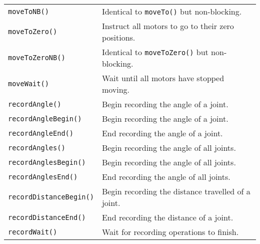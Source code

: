 \begin{table}[!h]
\begin{center}
\begin{tabular}{p{48 mm}p{110 mm}}
\texttt{moveToNB()} & Identical to \texttt{moveTo()} but non-blocking. \\
\texttt{moveToZero()} & Instruct all motors to go to their zero positions. \\
\texttt{moveToZeroNB()} & Identical to \texttt{moveToZero()} but non-blocking. \\
\texttt{moveWait()} & Wait until all motors have stopped moving. \\
\texttt{recordAngle()} & Begin recording the angle of a joint. \\
\texttt{recordAngleBegin()} & Begin recording the angle of a joint. \\
\texttt{recordAngleEnd()} & End recording the angle of a joint. \\
\texttt{recordAngles()} & Begin recording the angle of all joints. \\
\texttt{recordAnglesBegin()} & Begin recording the angle of all joints. \\
\texttt{recordAnglesEnd()} & End recording the angle of all joints. \\
\texttt{recordDistanceBegin()} & Begin recording the distance travelled of a joint. \\
\texttt{recordDistanceEnd()} & End recording the distance of a joint. \\
\texttt{recordWait()} & Wait for recording operations to finish. \\
\hline
\end{tabular}
\end{center}
\label{mobilec_api_cbinary}
\end{table}

\addtocounter{table}{-1}

